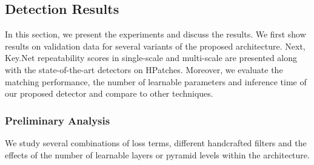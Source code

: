 \subsection{Detection Results}
\label{keynet_sec:results}

In this section, we present the experiments and discuss the results. We first show results on validation data for several variants of the proposed architecture. Next, Key.Net repeatability scores in single-scale and multi-scale are presented along with the state-of-the-art detectors on HPatches. Moreover, we evaluate the matching performance, the number of learnable parameters and inference time of our proposed detector and compare to other techniques.

\subsubsection{Preliminary Analysis}

\label{subsec:preliminary_analysis}
We study several combinations of loss terms, different handcrafted filters and the effects of the number of learnable layers or pyramid levels within the architecture.

